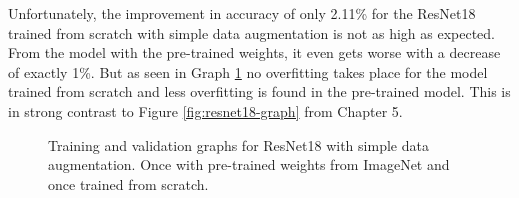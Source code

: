 \begin{table}[!h] \centering
{}
\caption{Cropping, resizing and  random flipping performed on the ResNet18 architecture with and without transfer learning. The first row is a run with the original configuration without any randomness or cropping and serves as comparison.}
\label{tbl:ResNet18_cropping}
\end{table}

Unfortunately, the improvement in accuracy of only 2.11\% for the ResNet18 trained from scratch with simple data augmentation is not as high as expected. From the model with the pre-trained weights, it even gets worse with a decrease of exactly 1\%. But as seen in Graph \ref{fig:resnet18-da-graph} no overfitting takes place for the model trained from scratch and less overfitting is found in the pre-trained model. This is in strong contrast to Figure \ref{fig:resnet18-graph} from Chapter 5.

\begin{figure}[!h]
\centering
\caption{Training and validation graphs for ResNet18 with simple data augmentation. Once with pre-trained weights from ImageNet and once trained from scratch.}
\label{fig:resnet18-da-graph}
\end{figure}

